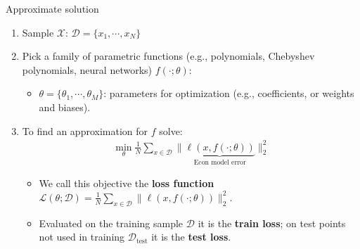 \documentclass[aspectratio=169,10pt]{beamer}
\newcommand{\emphcolor}[1]{\textbf{\textcolor{emphcolorval}{#1}}}
\begin{document}
\begin{frame}{Approximate solution}
	\begin{enumerate}
		\item Sample $\mathcal{X}$: $\mathcal{D} = \{x_1,\cdots,x_N\}$
		\vspace{0.025in}
		\item Pick a family of parametric functions (e.g., polynomials, Chebyshev polynomials, neural networks) $f(\cdot;\theta)$:
		\begin{itemize}
			\item $\theta = \{\theta_1,\cdots,\theta_M\}$: parameters for optimization (e.g., coefficients, or weights and biases).
		\end{itemize}
		\vspace{0.025in}
		\item To find an approximation for $f$ solve:
		\begin{align*}
			\min_{\theta } \frac{1}{N}\sum_{x \in \mathcal{D}} \|\underbrace{\ell\left(x,f(\cdot;\theta)\right)}_{\text{Econ model error}}\|_2^2
		\end{align*}
		\begin{itemize}
			\item We call this objective the \emphcolor{loss function} $\mathcal{L}(\theta;\mathcal{D}) = \frac{1}{N}\sum_{x \in \mathcal{D}} \|\ell(x,f(\cdot;\theta))\|_2^2$.
			\item Evaluated on the training sample $\mathcal{D}$ it is the \emphcolor{train loss}; on test points not used in training $\mathcal{D}_{\text{test}}$ it is the \emphcolor{test loss}.
		\end{itemize}
	\end{enumerate}
\end{frame}
\end{document}
